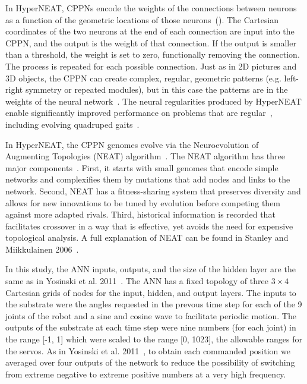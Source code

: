 In HyperNEAT, CPPNs encode the weights of the connections between neurons as a function of the geometric locations of those neurons~(). The Cartesian coordinates of the two neurons at the end of each connection are input into the CPPN, and the output is the weight of that connection. If the output is smaller than a threshold, the weight is set to zero, functionally removing the connection. The process is repeated for each possible connection. Just as in 2D pictures and 3D objects, the CPPN can create complex, regular, geometric patterns (e.g. left-right symmetry or repeated modules), but in this case the patterns are in the weights of the neural network~\cite{clune2011performance, }. The neural regularities produced by HyperNEAT enable significantly improved performance on problems that are regular~\cite{clune2011performance, stanley2009hypercube}, including evolving quadruped gaits~\cite{clune2011performance, clune2009evolving, clune2009sensitivity}. 

In HyperNEAT, the CPPN genomes evolve via the Neuroevolution of Augmenting Topologies (NEAT) algorithm~\cite{stanley2006exploiting}. 
The NEAT algorithm has three major components~\cite{stanley2006exploiting}. 
First, it starts with small genomes that encode simple networks and complexifies them by mutations that add nodes and links to the network. Second, NEAT has a fitness-sharing system that preserves diversity and allows for new innovations to be tuned by evolution before competing them against more adapted rivals. 
Third, historical information is recorded that facilitates crossover in a way that is effective, yet avoids the need for expensive topological analysis. A full explanation of NEAT can be found in Stanley and Miikkulainen 2006~\cite{stanley2006exploiting}. 

In this study, the ANN inputs, outputs, and the size of the hidden layer are the same as in Yosinski et al. 2011~\cite{yos:clune}. 
The ANN has a fixed topology of three \begin{math}3\times4\end{math} Cartesian grids of nodes for the input, hidden, and output layers. 
The inputs to the substrate were the angles requested in the prevous time step for each of the 9 joints of the robot and a sine and cosine wave to facilitate periodic motion. 
The outputs of the substrate at each time step were nine numbers (for each joint) in the range [-1, 1] which were scaled to the range [0, 1023], the allowable ranges for the servos. 
As in Yosinski et al. 2011~\cite{yos:clune}, to obtain each commanded position we averaged over four outputs of the network to reduce the possibility of switching from extreme negative to extreme positive numbers at a very high frequency. 

